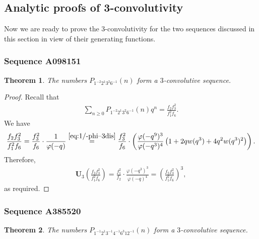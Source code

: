 \documentclass[12pt,reqno]{amsart}
\numberwithin{equation}{section}
\theoremstyle{plain}
\newtheorem{theorem}{Theorem}[section]
\theoremstyle{definition}
\theoremstyle{named}
\newcommand{\UU}{\mathbf{U}}
\begin{document}
\subsection{Analytic proofs of 3-convolutivity}

Now we are ready to prove the $3$-convolutivity for the two sequences discussed in this section in view of their generating functions.

\subsubsection{Sequence A098151}

\begin{theorem}\label{th:A098151}
	The numbers $P_{1^{-2}2^{1}3^{2}6^{-1}}(n)$ form a $3$-convolutive sequence.
\end{theorem}

\begin{proof}
	Recall that
	\begin{align*}
		\sum_{n\ge 0} P_{1^{-2}2^{1}3^{2}6^{-1}}(n) q^n = \frac{f_2 f_3^2}{f_1^2 f_6}.
	\end{align*}
	We have
	\begin{align*}
		\frac{f_2 f_3^2}{f_1^2 f_6} = \frac{f_3^2}{f_6}\cdot \frac{1}{\varphi(-q)} \overset{\eqref{eq:1/-phi--3dis}}{=} \frac{f_3^2}{f_6}\cdot \left(\frac{\varphi(-q^9)^3}{\varphi(-q^3)^4}\left(1+2qw(q^3)+4q^2 w(q^3)^2\right)\right).
	\end{align*}
	Therefore,
	\begin{align*}
		\UU_3\left(\frac{f_2 f_3^2}{f_1^2 f_6}\right) = \frac{f_1^2}{f_2}\cdot \frac{\varphi(-q^3)^3}{\varphi(-q)^4} = \left(\frac{f_2 f_3^2}{f_1^2 f_6}\right)^3,
	\end{align*}
	as required.
\end{proof}

\subsubsection{Sequence A385520}

\begin{theorem}\label{th:A293306}
	The numbers $P_{1^{-1} 2^1 3^{-1} 4^{-1} 6^3 12^{-1}}(n)$ form a $3$-convolutive sequence.
\end{theorem}
\end{document}
